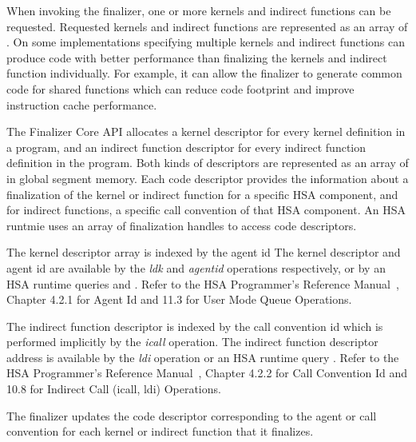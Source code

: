 \documentclass[final]{book}
\begin{document}
When invoking the finalizer, one or more kernels and indirect functions can be
requested. Requested kernels and indirect functions are represented as an
array of . On some implementations
specifying multiple kernels and indirect functions can produce code with better
performance than finalizing the kernels and indirect function individually. For
example, it can allow the finalizer to generate common code for shared functions
which can reduce code footprint and improve instruction cache performance.

The Finalizer Core API allocates a kernel descriptor for every kernel definition
in a program, and an indirect function descriptor for every indirect function
definition in the program. Both kinds of descriptors are represented as an array
of  in global segment memory. Each code
descriptor provides the information about a finalization of the kernel or
indirect function for a specific HSA component, and for indirect functions, a
specific call convention of that HSA component. An HSA runtmie uses an array of
finalization handles  to access code
descriptors.

The kernel descriptor array is indexed by the agent id
 The kernel descriptor and agent id are
available by the \emph{ldk} and \emph{agentid} operations respectively, or by an
HSA runtime queries  and
. Refer to the HSA Programmer's Reference
Manual~\cite{prm}, Chapter 4.2.1 for Agent Id and 11.3 for User Mode Queue
Operations.

The indirect function descriptor is indexed by the call convention id
 which is performed implicitly by
the \emph{icall} operation. The indirect function descriptor address is
available by the \emph{ldi} operation or an HSA runtime query
. Refer to the HSA
Programmer's Reference Manual~\cite{prm}, Chapter 4.2.2 for Call Convention Id
and 10.8 for Indirect Call (icall, ldi) Operations.

The finalizer updates the code descriptor corresponding to the agent or call
convention for each kernel or indirect function that it finalizes.
\end{document}
